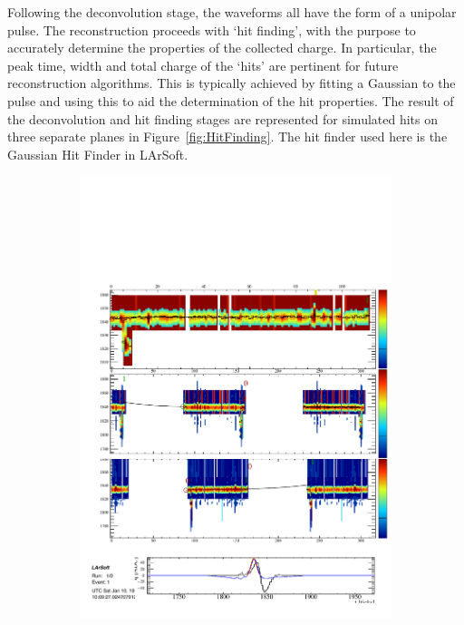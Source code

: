 Following the deconvolution stage, the waveforms all have the form of a unipolar pulse.  The reconstruction proceeds with `hit finding', with the purpose to accurately determine the properties of the collected charge.  In particular, the peak time, width and total charge of the `hits' are pertinent for future reconstruction algorithms.  This is typically achieved by fitting a Gaussian to the pulse and using this to aid the determination of the hit properties.  The result of the deconvolution and hit finding stages are represented for simulated hits on three separate planes in Figure~\ref{fig:HitFinding}.  The hit finder used here is the Gaussian Hit Finder in LArSoft.

\begin{figure}
  \centering
  \begin{subfigure}[t]{0.3\linewidth}
    \centering
    \includegraphics[width=\textwidth]{HitFindingU.pdf}

\end{subfigure}
\end{figure}
